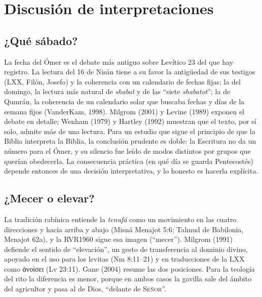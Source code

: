 \documentclass[11pt,letterpaper]{article}
\newcommand{\grc}[1]{\foreignlanguage{ancientgreek}{#1}}
\newcommand{\SENOR}{\textsc{Señor}}
\begin{document}
\section{Discusión de interpretaciones}

\subsection{¿Qué sábado?}
La fecha del Ómer es el debate más antiguo sobre Levítico 23 del que hay registro. La lectura del 16 de Nisán tiene a su favor la antigüedad de sus testigos (LXX, Filón, Josefo) y la coherencia con un calendario de fechas fijas; la del domingo, la lectura más natural de \emph{shabat} y de las ``siete \emph{shabatot}''; la de Qumrán, la coherencia de un calendario solar que buscaba fechas y días de la semana fijos (VanderKam, 1998). Milgrom (2001) y Levine (1989) exponen el debate en detalle; Wenham (1979) y Hartley (1992) muestran que el texto, por sí solo, admite más de una lectura. Para un estudio que sigue el principio de que la Biblia interpreta la Biblia, la conclusión prudente es doble: la Escritura no da un número para el Ómer, y su silencio fue leído de modos distintos por grupos que querían obedecerla. La consecuencia práctica (en qué día se guarda Pentecostés) depende entonces de una decisión interpretativa, y lo honesto es hacerla explícita.

\subsection{¿Mecer o elevar?}
La tradición rabínica entiende la \emph{tenufá} como un movimiento en las cuatro direcciones y hacia arriba y abajo (Misná Menajot 5:6; Talmud de Babilonia, Menajot 62a), y la RVR1960 sigue esa imagen (``mecer''). Milgrom (1991) defiende el sentido de ``elevación'', un gesto de transferencia al dominio divino, apoyado en el uso para los levitas (Nm 8:11--21) y en traducciones de la LXX como \grc{ἀνοίσει} (Lv 23:11). Gane (2004) resume las dos posiciones. Para la teología del rito la diferencia es menor, porque en ambos casos la gavilla sale del ámbito del agricultor y pasa al de Dios, ``delante de \SENOR''.
\end{document}
